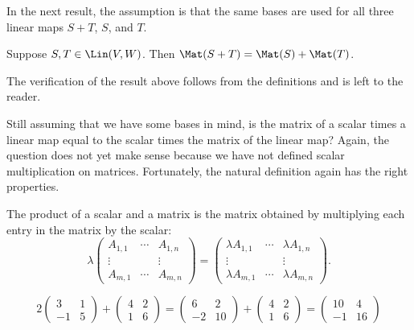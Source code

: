 In the next result, the assumption is that the same bases are used for all
three linear maps $S+T$, $S$, and $T$.

\begin{result}\label{ax:3.35}
Suppose $S,T\in\Lin(V,W)$. Then $\Mat(S+T)=\Mat(S)+\Mat(T)$.
\end{result}

The verification of the result above follows from the definitions and is left
to the reader.

Still assuming that we have some bases in mind, is the matrix of a scalar times
a linear map equal to the scalar times the matrix of the linear map? Again, the
question does not yet make sense because we have not defined scalar
multiplication on matrices. Fortunately, the natural definition again has the
right properties.

\begin{definition}\label{ax:3.36}
The product of a scalar and a matrix is the matrix obtained by multiplying each
entry in the matrix by the scalar:
\[ \lambda\begin{pmatrix} A_{1,1} & \cdots & A_{1,n}\\ \vdots & & \vdots\\
   A_{m,1} & \cdots & A_{m,n} \end{pmatrix}
 = \begin{pmatrix} \lambda A_{1,1} & \cdots & \lambda A_{1,n}\\
   \vdots & & \vdots\\
   \lambda A_{m,1} & \cdots & \lambda A_{m,n} \end{pmatrix}. \]
\end{definition}

\begin{example}\label{ax:3.37}
\leavevmode
\[ 2\begin{pmatrix} 3 & 1\\ -1 & 5 \end{pmatrix}
   + \begin{pmatrix} 4 & 2\\ 1 & 6 \end{pmatrix}
 = \begin{pmatrix} 6 & 2\\ -2 & 10 \end{pmatrix}
   + \begin{pmatrix} 4 & 2\\ 1 & 6 \end{pmatrix}
 = \begin{pmatrix} 10 & 4\\ -1 & 16 \end{pmatrix} \]
\end{example}

